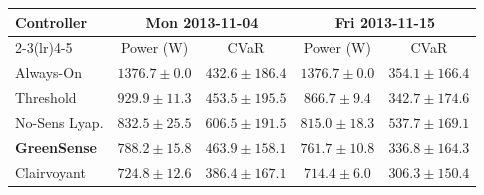 \begin{tabular}{lcccc}
\toprule
Controller & \multicolumn{2}{c}{Mon 2013-11-04} & \multicolumn{2}{c}{Fri 2013-11-15} \\
\cmidrule(lr){2-3}\cmidrule(lr){4-5}
& Power (W) & CVaR & Power (W) & CVaR \\
\midrule
Always-On & $1376.7\!\pm\!0.0$ & $432.6\!\pm\!186.4$ & $1376.7\!\pm\!0.0$ & $354.1\!\pm\!166.4$ \\
Threshold & $929.9\!\pm\!11.3$ & $453.5\!\pm\!195.5$ & $866.7\!\pm\!9.4$ & $342.7\!\pm\!174.6$ \\
No-Sens Lyap. & $832.5\!\pm\!25.5$ & $606.5\!\pm\!191.5$ & $815.0\!\pm\!18.3$ & $537.7\!\pm\!169.1$ \\
\textbf{GreenSense} & $788.2\!\pm\!15.8$ & $463.9\!\pm\!158.1$ & $761.7\!\pm\!10.8$ & $336.8\!\pm\!164.3$ \\
Clairvoyant & $724.8\!\pm\!12.6$ & $386.4\!\pm\!167.1$ & $714.4\!\pm\!6.0$ & $306.3\!\pm\!150.4$ \\
\bottomrule
\end{tabular}
